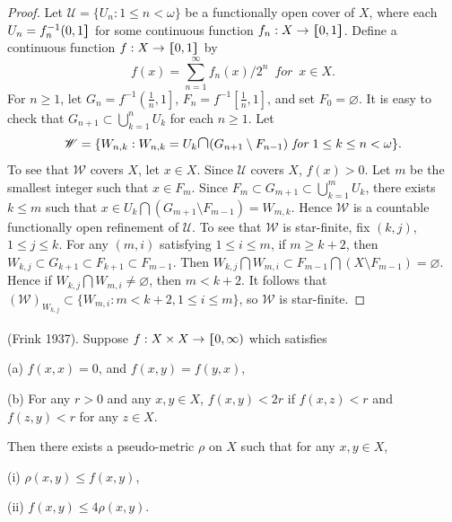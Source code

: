 \documentclass[main.tex]{subfiles}
\begin{document}
\begin{proof} 
Let $\mathscr{U} = \{U_n: 1 \le n < \omega\}$ be a functionally open cover of $X$, 
where each $U_n = f_n^{-1}(0, 1\hstretch{1.8}{]}$ for some continuous function $f_n: X \to \hstretch{1.8}{[}0, 1\hstretch{1.8}{]}$. 
Define a continuous function $f: X \to \hstretch{1.8}{[}0, 1\hstretch{1.8}{]}$ by
	$$f(x) = \sum_{n=1}^{\infty} f_n(x) / 2^n \, \textit{ for } \, x\in X.$$
For $n \ge 1$, let $G_n = f^{-1}\left(\frac{1}{n}, 1\right]$, 
	$F_n = f^{-1}\left[\frac{1}{n}, 1\right]$, and set $F_0 = \varnothing$.
It is easy to check that $G_{n+1} \subset \bigcup_{k=1}^{n} U_k$ for each $n \ge 1$.
Let
	$$\mathscr{W} = \{W_{n,k}: W_{n,k} = U_k \scalebox{1.4}{$\cap$} (G_{n+1} \setminus F_{n-1})
	\textit{ for } 
	1\le k \le n<\omega\}.$$
To see that $\mathscr{W}$ covers $X$, let $x \in X$. 
Since $\mathscr{U}$ covers $X$, $f(x) > 0$. Let $m$ be the smallest integer such that 
$x \in F_m$. Since $F_m \subset G_{m+1} \subset \bigcup_{k=1}^m U_k$, 
there exists $k \le m$ such that 
$x \in U_k \bigcap (G_{m+1} \setminus F_{m-1}) = W_{m,k}$.
Hence $\mathscr{W}$ is a countable functionally open refinement of $\mathscr{U}$.
To see that $\mathscr{W}$ is star-finite, fix $(k, j)$, $1 \le j \le k$. 
For any $(m, i)$ satisfying $1 \le i \le m$, if $m \ge k + 2$, 
then $W_{k,j} \subset G_{k+1} \subset F_{k+1} \subset F_{m-1}$. 
Then $W_{k,j} \bigcap W_{m,i} \subset F_{m-1}\bigcap(X\setminus F_{m-1})= \varnothing$.
Hence if $W_{k,j} \bigcap W_{m,i} \neq \varnothing$, then $m < k+2$.
It follows that $(\mathscr{W})_{W_{k,j}}\subset \{W_{m,i}: m < k+2, 1 \le i \le m\}$, 
so $\mathscr{W}$ is star-finite.
\end{proof}

{\theorem{\label{th:2.1.4}} \textup{(\hstretch{1.8}{[}Frink 1937\hstretch{1.8}{]}\textsuperscript{\cite{Frink}})}. Suppose $f: X \times X \to \hstretch{1.8}{[}0, \infty)$ which satisfies
	
\textup{(a)} $f(x,x)=0$, and $f(x,y)=f(y,x)$,
	
\textup{(b)} For any $r > 0$ and any $x, y\in X$,   $f(x,y) < 2r$ if $f(x,z) < r$ 
and $f(z, y) < r$ for any $z\in X$.
	
Then there exists a pseudo-metric $\rho$ on $X$ such that for any $x, y \in X$,
	
\textup{(i)}  $\rho(x,y) \le f(x,y)$,
	
\textup{(ii)}  $f(x,y) \le 4\rho(x,y)$.
}
\end{document}
